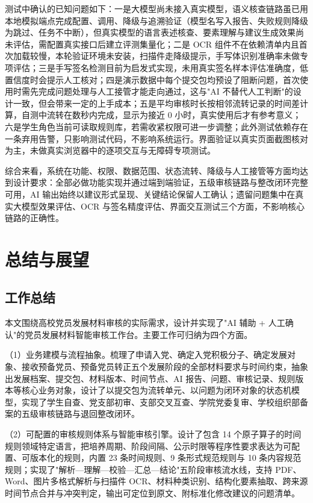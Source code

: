 \documentclass[12pt,a4paper]{ctexart}
\begin{document}
测试中确认的已知问题如下：一是大模型尚未接入真实模型，语义核查链路虽已用本地模拟端点完成配置、调用、降级与追溯验证（模型名写入报告、失败规则降级为跳过、任务不中断），但真实模型的语言表述核查、要素理解与建议生成效果尚未评估，需配置真实接口后建立评测集量化；二是 OCR 组件不在依赖清单内且首次加载较慢，本轮验证环境未安装，扫描件走降级提示，手写体识别准确率未做专项评估；三是手写签名检测目前为启发式实现，未用真实签名样本评估准确度，低置信度时会提示人工核对；四是演示数据中每个提交包均预设了阻断问题，首次使用时需先完成问题处理与人工接管才能走向通过，这与"AI 不替代人工判断"的设计一致，但会带来一定的上手成本；五是平均审核时长按相邻流转记录的时间差计算，自测中流转在数秒内完成，显示为接近 0 小时，真实使用后才有参考意义；六是学生角色当前可读取规则库，若需收紧权限可进一步调整；此外测试依赖存在一条弃用告警，只影响测试代码，不影响系统运行。界面验证以真实页面截图核对为主，未做真实浏览器中的逐项交互与无障碍专项测试。

综合来看，系统在功能、权限、数据范围、状态流转、降级与人工接管等方面均达到设计要求：全部必做功能实现并通过端到端验证，五级审核链路与整改闭环完整可用，AI 输出始终以建议形式呈现、关键结论保留人工确认；遗留问题集中在真实大模型效果评估、OCR 与签名精度评估、界面交互测试三个方面，不影响核心链路的正确性。

\clearpage

\section{总结与展望}

\subsection{工作总结}

本文围绕高校党员发展材料审核的实际需求，设计并实现了"AI 辅助 + 人工确认"的党员发展材料智能审核工作台。主要工作可归纳为四个方面。

（1）业务建模与流程抽象。梳理了申请入党、确定入党积极分子、确定发展对象、接收预备党员、预备党员转正五个发展阶段的全部材料要求与时间约束，抽象出发展档案、提交包、材料版本、时间节点、AI 报告、问题、审核记录、规则版本等核心业务对象，设计了以提交包为流转单元、以问题为闭环对象的状态机模型，实现了学生自查、党支部初审、支部交叉互查、学院党委复审、学校组织部备案的五级审核链路与退回整改闭环。

（2）可配置的审核规则体系与智能审核引擎。设计了包含 14 个原子算子的时间规则领域特定语言，把培养周期、阶段间隔、公示时限等程序性要求表达为可配置、可版本化的规则，内置 23 条时间规则、9 条形式规范规则与 10 条内容规范规则；实现了"解析—理解—校验—汇总—结论"五阶段审核流水线，支持 PDF、Word、图片多格式解析与扫描件 OCR、材料种类识别、结构化要素抽取、跨来源时间节点合并与冲突判定，输出可定位到原文、附标准化修改建议的问题清单。
\end{document}
